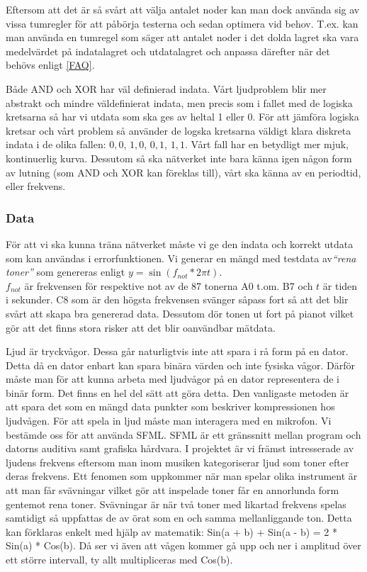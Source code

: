 \documentclass[a4paper,10pt]{article}
\begin{document}
Eftersom att det är så svårt att välja antalet noder kan man dock använda sig av vissa tumregler för att påbörja testerna och sedan optimera vid behov. T.ex. kan man använda en tumregel som säger att antalet noder i det dolda lagret ska vara medelvärdet på indatalagret och utdatalagret \autocite{StackExchange} och anpassa därefter när det behövs enligt \ref{FAQ}.

Både AND och XOR har väl definierad indata. Vårt ljudproblem blir mer abstrakt och mindre väldefinierat indata, men precis som i fallet med de logiska kretsarna så har vi utdata som ska ges av heltal 1 eller 0. För att jämföra logiska kretsar och vårt problem så använder de logska kretsarna väldigt klara diskreta indata i de olika fallen: $0,0$, $1,0$, $0,1$, $1,1$. Vårt fall har en betydligt mer mjuk, kontinuerlig kurva. Dessutom så ska nätverket inte bara känna igen någon form av lutning (som AND och XOR kan föreklas till), vårt ska känna av en periodtid, eller frekvens. 

\subsubsection{Data}
För att vi ska kunna träna nätverket måste vi ge den indata och korrekt utdata som kan användas i errorfunktionen. Vi generar en mängd med testdata av\emph{``rena toner''} som genereras enligt $y=\sin(f_{not}*2\pi t)$.\autocite{Wave}\\
$f_{not}$ är frekvensen för respektive not av de 87 tonerna A0 t.om. B7 och $t$ är tiden i sekunder. C8 som är den högsta frekvensen svänger såpass fort så att det blir svårt att skapa bra genererad data. Dessutom dör tonen ut fort på pianot vilket gör att det finns stora risker att det blir oanvändbar mätdata.

Ljud är tryckvågor. Dessa går naturligtvis inte att spara i rå form på en dator. Detta då en dator enbart kan spara binära värden och inte fysiska vågor. Därför måste man för att kunna arbeta med ljudvågor på en dator representera de i binär form. Det finns en hel del sätt att göra detta. Den vanligaste metoden är att spara det som en mängd data punkter som beskriver kompressionen hos ljudvågen. 
För att spela in ljud måste man interagera med en mikrofon. Vi bestämde oss för att använda SFML. SFML är ett gränssnitt mellan program och datorns auditiva samt grafiska hårdvara.  
I projektet är vi främst intresserade av ljudens frekvens eftersom man inom musiken kategoriserar ljud som toner efter deras frekvens. Ett fenomen som uppkommer när man spelar olika instrument är att man får svävningar vilket gör att inspelade toner får en annorlunda form gentemot rena toner. Svävningar är när två toner med likartad frekvens spelas samtidigt så uppfattas de av örat som en och samma mellanliggande ton\autocite{BEAT}. Detta kan förklaras enkelt med hjälp av matematik: Sin(a + b) + Sin(a - b) = 2 * Sin(a) * Cos(b). Då ser vi även att vågen kommer gå upp och ner i amplitud över ett större intervall, ty allt multipliceras med Cos(b). 
\end{document}
